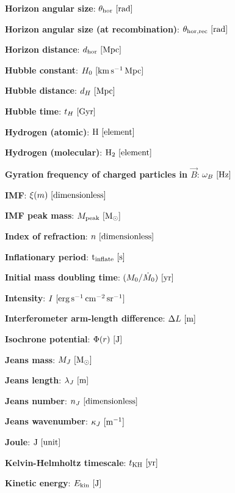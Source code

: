 \documentclass[a4paper,10pt]{article}
\begin{document}
{\noindent}\textbf{Horizon angular size}: $\theta_\mathrm{hor} ~ [{\rm rad}]$

{\noindent}\textbf{Horizon angular size (at recombination)}: $\theta_\mathrm{hor,rec} ~ [{\rm rad}]$

{\noindent}\textbf{Horizon distance}: $d_\mathrm{hor} ~ [{\rm Mpc}]$

{\noindent}\textbf{Hubble constant}: $H_0 ~ [{\rm km\,s^{-1}\,Mpc}]$

{\noindent}\textbf{Hubble distance}: $d_H ~ [{\rm Mpc}]$

{\noindent}\textbf{Hubble time}: $t_H ~ [{\rm Gyr}]$

{\noindent}\textbf{Hydrogen (atomic)}: ${\rm H} ~ [{\rm element}]$

{\noindent}\textbf{Hydrogen (molecular)}: ${\rm H_2} ~ [{\rm element}]$

{\noindent}\textbf{Gyration frequency of charged particles in $\vec{B}$}: $\omega_B ~ [{\rm Hz}]$

{\noindent}\textbf{IMF}: $\xi(m) ~ [{\rm dimensionless}]$

{\noindent}\textbf{IMF peak mass}: $M_\mathrm{peak} ~ [{\rm M_\odot}]$

{\noindent}\textbf{Index of refraction}: $n ~ [{\rm dimensionless}]$

{\noindent}\textbf{Inflationary period}: ${\rm t_\mathrm{inflate}} ~ [{\rm s}]$

{\noindent}\textbf{Initial mass doubling time}: $(M_0/\dot{M}_0) ~ [{\rm yr}]$

{\noindent}\textbf{Intensity}: $I ~ [{\rm erg\,s^{-1}\,cm^{-2}\,sr^{-1}}]$

{\noindent}\textbf{Interferometer arm-length difference}: $\Delta L ~ [{\rm m}]$

{\noindent}\textbf{Isochrone potential}: $\Phi(r) ~ [{\rm J}]$

{\noindent}\textbf{Jeans mass}: $M_J ~ [{\rm M_\odot}]$

{\noindent}\textbf{Jeans length}: $\lambda_J ~ [{\rm m}]$

{\noindent}\textbf{Jeans number}: $n_J ~ [{\rm dimensionless}]$

{\noindent}\textbf{Jeans wavenumber}: $\kappa_J ~ [{\rm m^{-1}}]$

{\noindent}\textbf{Joule}: ${\rm J} ~ [{\rm unit}]$

{\noindent}\textbf{Kelvin-Helmholtz timescale}: $t_{\rm KH} ~ [{\rm yr}]$

{\noindent}\textbf{Kinetic energy}: $E_\mathrm{kin} ~ [{\rm J}]$
\end{document}
